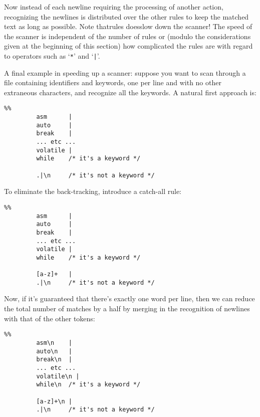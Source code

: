 \documentclass[openany,oneside]{book}
\begin{document}
Now instead of each newline requiring the processing of another action,
recognizing the newlines is distributed over the other rules to keep the
matched text as long as possible.  Note thatrules doesslow down the scanner!  The speed of the scanner is
independent of the number of rules or (modulo the considerations given
at the beginning of this section) how complicated the rules are with
regard to operators such as ‘\verb`*`’ and ‘\verb`|`’.

A final example in speeding up a scanner: suppose you want to scan
through a file containing identifiers and keywords, one per line
and with no other extraneous characters, and recognize all the
keywords.  A natural first approach is:


\begin{verbatim}
%%
         asm      |
         auto     |
         break    |
         ... etc ...
         volatile |
         while    /* it's a keyword */
     
         .|\n     /* it's not a keyword */
\end{verbatim}


To eliminate the back-tracking, introduce a catch-all rule:
\begin{verbatim}
%%
         asm      |
         auto     |
         break    |
         ... etc ...
         volatile |
         while    /* it's a keyword */
     
         [a-z]+   |
         .|\n     /* it's not a keyword */
\end{verbatim}


Now, if it's guaranteed that there's exactly one word per line, then we
can reduce the total number of matches by a half by merging in the
recognition of newlines with that of the other tokens:
\begin{verbatim}
%%
         asm\n    |
         auto\n   |
         break\n  |
         ... etc ...
         volatile\n |
         while\n  /* it's a keyword */
     
         [a-z]+\n |
         .|\n     /* it's not a keyword */
\end{verbatim}
\end{document}
